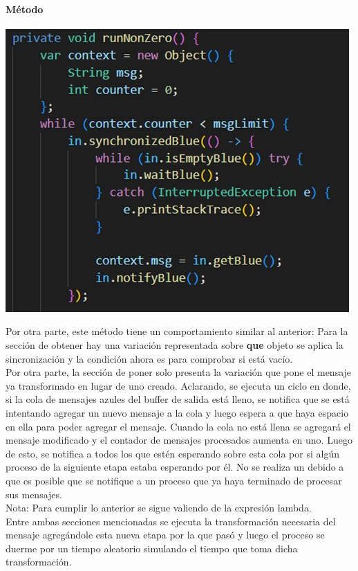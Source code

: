 \documentclass[a4paper]{article}
\begin{document}
    \paragraph{M\'etodo }
    \begin{center}
        \includegraphics[scale=0.5]{B3.jpeg}    
    \end{center}
    Por otra parte, este m\'etodo tiene un comportamiento similar al anterior:
    Para la secci\'on de obtener hay una variaci\'on representada sobre \textbf{que} objeto se aplica la sincronizaci\'on y la condici\'on ahora es para comprobar si est\'a vac\'io.\\
    Por otra parte, la secci\'on de poner solo presenta la variaci\'on que pone el mensaje ya transformado en lugar de uno creado.
    Aclarando, se ejecuta un ciclo en donde, si la cola de mensajes azules del buffer de salida est\'a lleno, se notifica que se est\'a intentando agregar un nuevo mensaje a la cola y luego espera a que haya espacio en ella para poder agregar el mensaje.
    Cuando la cola no est\'a llena se agregar\'a el mensaje modificado y el contador de mensajes procesados aumenta en uno.
    Luego de esto, se notifica a todos los que est\'en esperando sobre esta cola por si alg\'un proceso de la siguiente etapa estaba esperando por \'el.
    No se realiza un  debido a que es posible que se notifique a un proceso que ya haya terminado de procesar sus mensajes.\\
    Nota: Para cumplir lo anterior se sigue valiendo de la expresi\'on lambda.\\
    Entre ambas secciones mencionadas se ejecuta la transformaci\'on necesaria del mensaje agreg\'andole esta nueva etapa por la que pas\'o y luego el proceso se duerme por un tiempo aleatorio simulando el tiempo que toma dicha transformaci\'on.
\end{document}
